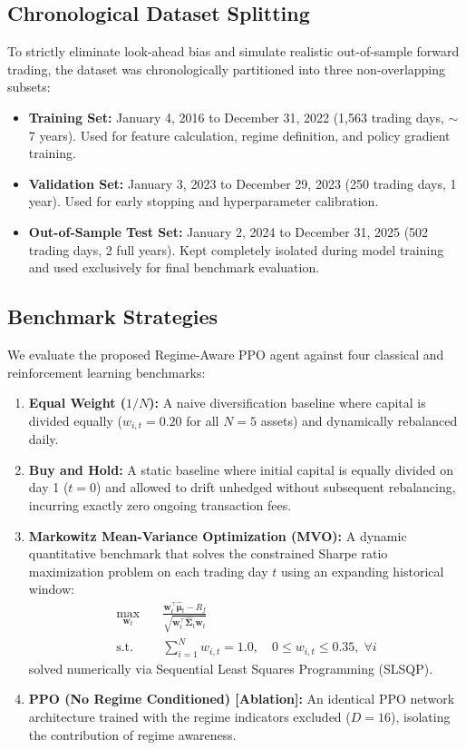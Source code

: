 \documentclass[conference]{IEEEtran}
\begin{document}
\subsection{Chronological Dataset Splitting}
To strictly eliminate look-ahead bias and simulate realistic out-of-sample forward trading, the dataset was chronologically partitioned into three non-overlapping subsets:
\begin{itemize}
    \item \textbf{Training Set:} January 4, 2016 to December 31, 2022 (1,563 trading days, $\sim$7 years). Used for feature calculation, regime definition, and policy gradient training.
    \item \textbf{Validation Set:} January 3, 2023 to December 29, 2023 (250 trading days, 1 year). Used for early stopping and hyperparameter calibration.
    \item \textbf{Out-of-Sample Test Set:} January 2, 2024 to December 31, 2025 (502 trading days, 2 full years). Kept completely isolated during model training and used exclusively for final benchmark evaluation.
\end{itemize}

\subsection{Benchmark Strategies}
We evaluate the proposed Regime-Aware PPO agent against four classical and reinforcement learning benchmarks:
\begin{enumerate}
    \item \textbf{Equal Weight ($1/N$):} A naive diversification baseline where capital is divided equally ($w_{i,t} = 0.20$ for all $N=5$ assets) and dynamically rebalanced daily.
    \item \textbf{Buy and Hold:} A static baseline where initial capital is equally divided on day 1 ($t=0$) and allowed to drift unhedged without subsequent rebalancing, incurring exactly zero ongoing transaction fees.
    \item \textbf{Markowitz Mean-Variance Optimization (MVO):} A dynamic quantitative benchmark that solves the constrained Sharpe ratio maximization problem on each trading day $t$ using an expanding historical window:
    \begin{align}
        \max_{\mathbf{w}_t} \quad & \frac{\mathbf{w}_t^\top \hat{\boldsymbol{\mu}}_t - R_f}{\sqrt{\mathbf{w}_t^\top \hat{\boldsymbol{\Sigma}}_t \mathbf{w}_t}} \\
        \text{s.t.} \quad & \sum_{i=1}^N w_{i,t} = 1.0, \quad 0 \le w_{i,t} \le 0.35, \; \forall i
    \end{align}
    solved numerically via Sequential Least Squares Programming (SLSQP).
    \item \textbf{PPO (No Regime Conditioned) [Ablation]:} An identical PPO network architecture trained with the regime indicators excluded ($D=16$), isolating the contribution of regime awareness.
\end{enumerate}
\end{document}
